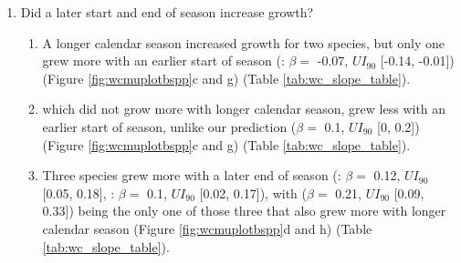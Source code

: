 \documentclass{article}\usepackage[]{graphicx}\usepackage[]{xcolor}
\begin{document}
\begin{enumerate}
\begin{enumerate}
  \item Longer thermal season increased growth for {\Bpap} 
  ($\beta = $ 
  0.44, $UI_{90}$
  [0.18, 
  0.7]),
  {\Bpop} 
  ($\beta = $ 
  0.22, $UI_{90}$
  [0.07, 
  0.36]), and {\Ball} 
  ($\beta = $ 
  0.13, $UI_{90}$
  [0.01, 
  0.24]), but {\Ainc} had a weak effect, but trended in the same direction 
  ($\beta = $ 
  0.07, $UI_{90}$
  [-0.04, 
  0.17]) (Figure \ref{fig:wcmuplotbspp}a and e) (Table\ref{tab:wc_slope_table}).
 
  \item {\Ainc} grew more with longer calendar seasons ($\beta = $ 
  0.05, $UI_{90}$
  [0, 
  0.1]), but of the three species that responded to thermal season, only {\Bpap} also grew more with longer calendar seasons ($\beta = $ 
  0.18, $UI_{90}$
  [0.05, 
  0.32]).
  \item {\Ball} ($\beta = $ 
  0.03, $UI_{90}$
  [-0.02, 
  0.09]), and {\Bpop} ($\beta = $ 
  0.05, $UI_{90}$
  [-0.02, 
  0.13]) trended in the same direction (Figure \ref{fig:wcmuplotbspp}b and f) (Table \ref{tab:wc_slope_table}).
  
  \item Results with basal area increment (BAI) for the GDD model were broadly similar to ring width (see Table \ref{tab:BAItab}) 
  
  \item On a scaled axis, both predictors were similarly predictive (Figure\ref{fig:bsppZscored}). 
  \end{enumerate}
  
\item Did a later start and end of season increase growth?
  \begin{enumerate}
  \item A longer calendar season increased growth for two species, but only one grew more with an earlier start of season ({\Ainc}: $\beta = $ 
  -0.07, $UI_{90}$
  [-0.14, 
  -0.01]) (Figure \ref{fig:wcmuplotbspp}c and g) (Table \ref{tab:wc_slope_table}).
  
  \item {\Ball} which did not grow more with longer calendar season, grew less with an earlier start of season, unlike our prediction ($\beta = $ 
  0.1, $UI_{90}$
  [0, 
  0.2]) (Figure \ref{fig:wcmuplotbspp}c and g) (Table \ref{tab:wc_slope_table}).
  
  \item Three species grew more with a later end of season ({\Ball}: $\beta = $ 
  0.12, $UI_{90}$
  [0.05, 
  0.18], 
  {\Bpop}: $\beta = $ 
  0.1, $UI_{90}$
  [0.02, 
  0.17]), with {\Bpap} 
  ($\beta = $ 
  0.21, $UI_{90}$
  [0.09, 
  0.33])
  being the only one of those three that also grew more with longer calendar season (Figure \ref{fig:wcmuplotbspp}d and h) (Table \ref{tab:wc_slope_table}).
  

\end{enumerate}
\end{enumerate}
\end{document}
